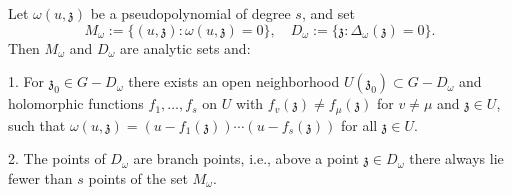 Let $\omega(u, \mathfrak{z})$ be a pseudopolynomial of degree $s$, and set
$$M_{\omega} := \{(u, \mathfrak{z}) : \omega(u, \mathfrak{z}) = 0\}, \quad D_{\omega} := \{\mathfrak{z} : \Delta_{\omega}(\mathfrak{z}) = 0\}.$$
Then $M_{\omega}$ and $D_{\omega}$ are analytic sets and:

1. For $\mathfrak{z}_0 \in G - D_{\omega}$ there exists an open neighborhood $U(\mathfrak{z}_0) \subset G - D_{\omega}$ and holomorphic functions $f_1, \ldots, f_s$ on $U$ with $f_v(\mathfrak{z}) \neq f_\mu(\mathfrak{z})$ for $v \neq \mu$ and $\mathfrak{z} \in U$, such that $\omega(u, \mathfrak{z}) = (u - f_1(\mathfrak{z})) \cdots (u - f_s(\mathfrak{z}))$ for all $\mathfrak{z} \in U$.

2. The points of $D_{\omega}$ are branch points, i.e., above a point $\mathfrak{z} \in D_{\omega}$ there always lie fewer than $s$ points of the set $M_{\omega}$.
